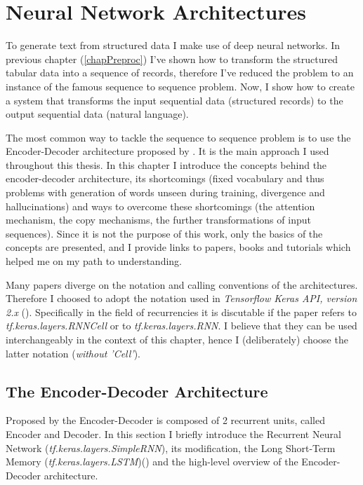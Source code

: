 \chapter{Neural Network Architectures}
To generate text from structured data I make use of deep neural networks. In previous chapter (\ref{chapPreproc}) I've shown how to transform the structured tabular data into a sequence of records, therefore I've reduced the problem to an instance of the famous sequence to sequence problem. Now, I show how to create a system that transforms the input sequential data (structured records) to the output sequential data (natural language).

The most common way to tackle the sequence to sequence problem is to use the Encoder-Decoder architecture proposed by \citep{sutskever2014sequence}. It is the main approach I used throughout this thesis. In this chapter I introduce the concepts behind the encoder-decoder architecture, its shortcomings (fixed vocabulary and thus problems with generation of words unseen during training, divergence and hallucinations) and ways to overcome these shortcomings (the attention mechanism, the copy mechanisms, the further transformations of input sequences). Since it is not the purpose of this work, only the basics of the concepts are presented, and I provide links to papers, books and tutorials which helped me on my path to understanding.

Many papers diverge on the notation and calling conventions of the architectures. Therefore I choosed to adopt the notation used in \emph{Tensorflow Keras API, version 2.x} (\citep{tensorflow2015-whitepaper}). Specifically in the field of recurrencies it is discutable if the paper refers to \emph{tf.keras.layers.RNNCell} or to \emph{tf.keras.layers.RNN}. I believe that they can be used interchangeably in the context of this chapter, hence I (deliberately) choose the latter notation (\emph{without 'Cell'}).

\section {The Encoder-Decoder Architecture}

Proposed by \citep{sutskever2014sequence} the Encoder-Decoder is composed of 2 recurrent units, called Encoder and Decoder. In this section I briefly introduce the Recurrent Neural Network (\emph{tf.keras.layers.SimpleRNN}), its modification, the Long Short-Term Memory (\emph{tf.keras.layers.LSTM})(\citep{hochreiter1997}) and the high-level overview of the Encoder-Decoder architecture.

